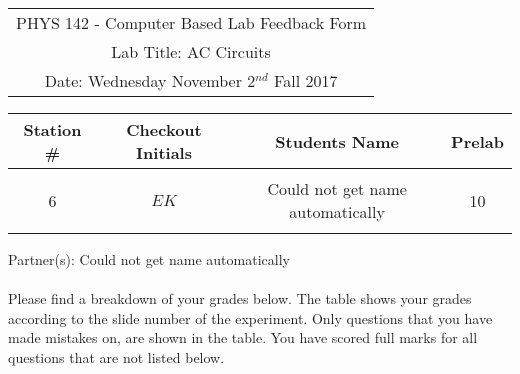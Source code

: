 \documentclass{article}
\begin{document}

\begin{table}[h]
	\centering
	\begin{tabular}{c}
	PHYS 142 - Computer Based Lab Feedback Form\\
	Lab Title: AC Circuits\\Date: Wednesday November 2$^{nd}$ Fall 2017 \\\hline
\end{tabular}
\end{table}
\begin{table}[h]\centering \begin{tabular}{|c|c|p{9.9 cm}|c|}\hline Station \#  & Checkout Initials & \multicolumn{1}{|c|}{Students Name} & Prelab \\\hline\multirow{3}{*}{6}& \multirow{3}{*}{$EK$} & &\\& &\multicolumn{1}{|c|}{Could not get name automatically}&10\\&   &  &\\\hline
\end{tabular}
\end{table}
Partner(s): Could not get name automatically\\
\\Please find a breakdown of your grades below. The table shows your grades according to the slide number of the experiment. Only questions that you have made mistakes on, are shown in the table. You have scored full marks for all questions that are not listed below.
\end{document}
